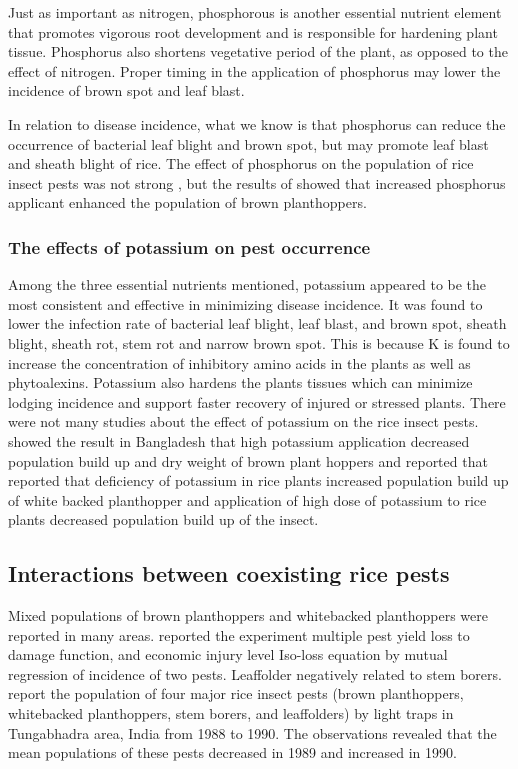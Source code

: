 Just as important as nitrogen, phosphorous is another essential nutrient element that promotes vigorous root development and is responsible for hardening plant tissue. Phosphorus also shortens vegetative period of the plant, as opposed to the effect of nitrogen. Proper timing in the application of phosphorus may lower the incidence of brown spot and leaf blast.

In relation to disease incidence, what we know is that phosphorus can reduce the occurrence of bacterial leaf blight and brown spot, but may promote leaf blast and sheath blight of rice. The effect of phosphorus on the population of rice insect pests was not strong \citep{chau2003impacts,rashid2014effect}, but the results of \cite{rashid2014effect} showed that increased phosphorus applicant enhanced the population of brown planthoppers.

\subsubsection{The effects of potassium on pest occurrence}

Among the three essential nutrients mentioned, potassium appeared to be the most consistent and effective in minimizing disease incidence. It was found to lower the infection rate of bacterial leaf blight, leaf blast, and brown spot, sheath blight, sheath rot, stem rot and narrow brown spot. This is because K is found to increase the concentration of inhibitory amino acids in the plants as well as phytoalexins. Potassium also hardens the plants tissues which can minimize lodging incidence and support faster recovery of injured or stressed plants. There were not many studies about the effect of potassium on the rice insect pests. \cite{rashid2014effect} showed the result in Bangladesh that high potassium application decreased population build up and dry weight of brown plant hoppers and \cite{salim2002effects} reported that reported that deficiency of potassium in rice plants increased population build up of white backed planthopper and application of high dose of potassium to rice plants decreased population build up of the insect.

\subsection*{Interactions between coexisting rice pests}

Mixed populations of brown planthoppers and whitebacked planthoppers were reported in many areas. \cite{naganagoud2010studies} reported the experiment multiple pest yield loss to damage function, and economic injury level Iso-loss equation by mutual regression of incidence of two pests. Leaffolder negatively related to stem borers. \cite{selvaraj2012determination} report the population of four major rice insect pests (brown planthoppers, whitebacked planthoppers, stem borers, and leaffolders) by light traps in Tungabhadra area, India from 1988 to 1990. The observations revealed that the mean populations of these pests decreased in 1989 and increased in 1990.

